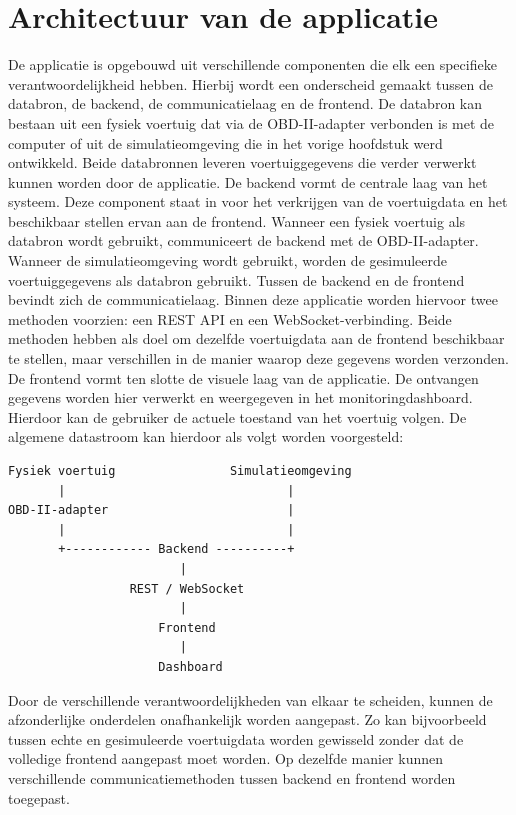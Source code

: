 \section{Architectuur van de applicatie}
De applicatie is opgebouwd uit verschillende componenten die elk een specifieke verantwoordelijkheid hebben. Hierbij wordt een onderscheid gemaakt tussen de databron, de backend, de communicatielaag en de frontend.
De databron kan bestaan uit een fysiek voertuig dat via de OBD-II-adapter verbonden is met de computer of uit de simulatieomgeving die in het vorige hoofdstuk werd ontwikkeld. Beide databronnen leveren voertuiggegevens die verder verwerkt kunnen worden door de applicatie.
De backend vormt de centrale laag van het systeem. Deze component staat in voor het verkrijgen van de voertuigdata en het beschikbaar stellen ervan aan de frontend. Wanneer een fysiek voertuig als databron wordt gebruikt, communiceert de backend met de OBD-II-adapter. Wanneer de simulatieomgeving wordt gebruikt, worden de gesimuleerde voertuiggegevens als databron gebruikt.
Tussen de backend en de frontend bevindt zich de communicatielaag. Binnen deze applicatie worden hiervoor twee methoden voorzien: een REST API en een WebSocket-verbinding. Beide methoden hebben als doel om dezelfde voertuigdata aan de frontend beschikbaar te stellen, maar verschillen in de manier waarop deze gegevens worden verzonden.
De frontend vormt ten slotte de visuele laag van de applicatie. De ontvangen gegevens worden hier verwerkt en weergegeven in het monitoringdashboard. Hierdoor kan de gebruiker de actuele toestand van het voertuig volgen.
De algemene datastroom kan hierdoor als volgt worden voorgesteld:

\begin{verbatim}
Fysiek voertuig                Simulatieomgeving
       |                               |
OBD-II-adapter                         |
       |                               |
       +------------ Backend ----------+
                        |
                 REST / WebSocket
                        |
                     Frontend
                        |
                     Dashboard
\end{verbatim}

Door de verschillende verantwoordelijkheden van elkaar te scheiden, kunnen de afzonderlijke onderdelen onafhankelijk worden aangepast. Zo kan bijvoorbeeld tussen echte en gesimuleerde voertuigdata worden gewisseld zonder dat de volledige frontend aangepast moet worden. Op dezelfde manier kunnen verschillende communicatiemethoden tussen backend en frontend worden toegepast.

